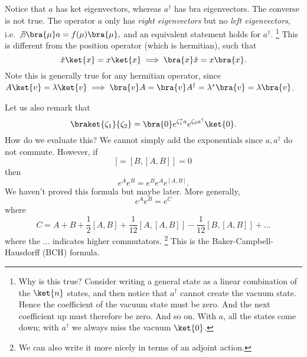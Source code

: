 Notice that $a$ has ket eigenvectors, whereas $a^\dagger$ has bra eigenvectors. The converse is not true. The operator $a$ only has \emph{right eigenvectors} but no \emph{left eigenvectors}, i.e. $\not\exists \bra{\mu}a = f(\mu)\bra{\mu},$ and an equivalent statement holds for $a^\dagger$.%
    \footnote{Why is this true? Consider writing a general state as a linear combination of the $\ket{n}$ states, and then notice that $a^\dagger$ cannot create the vacuum state. Hence the coefficient of the vacuum state must be zero. And the next coefficient up must therefore be zero. And so on. With $a$, all the states come down; with $a^\dagger$ we always miss the vacuum $\ket{0}$.}
This is different from the position operator (which is hermitian), such that
\begin{equation}
    \hat x\ket{x} = x \ket{x} \implies \bra{x} \hat x = x \bra{x}.
\end{equation}
Note this is generally true for any hermitian operator, since $A\ket{v} = \lambda \ket{v} \implies \bra{v}A = \bra{v} A^\dagger =\lambda^* \bra{v} =\lambda \bra{v}$.

Let us also remark that
\begin{equation}
    \braket{\zeta_1}{\zeta_2} = \bra{0} e^{\zeta_1^* a} e^{\zeta_2 a^\dagger}\ket{0}.
\end{equation}
How do we evaluate this? We cannot simply add the exponentials since $a,a^\dagger$ do not commute. However, if
\begin{equation}
    [A,[A,B]]=[B,[A,B]]=0
\end{equation}
then
\begin{equation}
    e^A e^B = e^B e^A e^{[A,B]}.
\end{equation}
We haven't proved this formula but maybe later.
More generally,
\begin{equation}
    e^A e^B = e^C
\end{equation}
where
\begin{equation}
    C= A  + B +\frac{1}{2}[A,B] +\frac{1}{12} [A,[A,B]]-\frac{1}{12}[B,[A,B]]+\ldots
\end{equation}
where the $\ldots$ indicates higher commutators.%
    \footnote{We can also write it more nicely in terms of an adjoint action.}
This is the Baker-Campbell-Hausdorff (BCH) formula.

